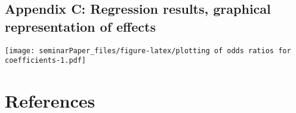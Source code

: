 \documentclass[
  12pt,
  english,
]{article}
\begin{document}
\hypertarget{appendix-c-regression-results-graphical-representation-of-effects}{%
\subsection{Appendix C: Regression results, graphical representation of
effects}\label{appendix-c-regression-results-graphical-representation-of-effects}}

\texttt{[image: seminarPaper\_files/figure-latex/plotting of odds ratios for coefficients-1.pdf]}

\hypertarget{references}{%
\section*{References}\label{references}}
\end{document}
